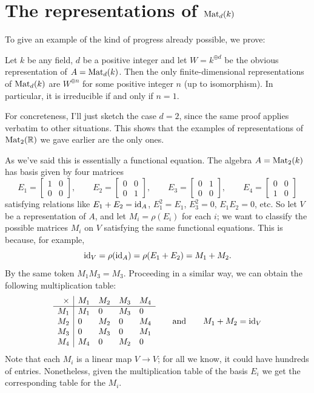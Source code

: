 \section{The representations of $\mathrm{Mat}_d(k)$}
To give an example of the kind of progress already possible, we prove:
\begin{theorem}
	\label{thm:rep_1mat}
	Let $k$ be any field, $d$ be a positive integer and
	let $W = k^{\oplus d}$ be the obvious representation of $A = \mathrm{Mat}_d(k)$.
	Then the only finite-dimensional representations
	of $\mathrm{Mat}_d(k)$ are $W^{\oplus n}$
	for some positive integer $n$ (up to isomorphism).
	In particular, it is irreducible if and only if $n=1$.
\end{theorem}
For concreteness, I'll just sketch the case $d=2$,
since the same proof applies verbatim to other situations.
This shows that the examples of representations of $\mathrm{Mat}_2(\mathbb R)$
we gave earlier are the only ones.

As we've said this is essentially a functional equation.
The algebra $A = \mathrm{Mat}_2(k)$ has basis given by four matrices
\[
	E_1 = \begin{bmatrix} 1 & 0 \\ 0 & 0 \end{bmatrix},
	\qquad
	E_2 = \begin{bmatrix} 0 & 0 \\ 0 & 1 \end{bmatrix},
	\qquad
	E_3 = \begin{bmatrix} 0 & 1 \\ 0 & 0 \end{bmatrix},
	\qquad
	E_4 = \begin{bmatrix} 0 & 0 \\ 1 & 0 \end{bmatrix}
\]
satisfying relations like $E_1 + E_2 = \mathrm{id}_A$, $E_1^2 = E_1$, $E_3^2 = 0$, $E_1E_2 = 0$, etc.
So let $V$ be a representation of $A$, and let $M_i = \rho(E_i)$ for each $i$;
we want to classify the possible matrices $M_i$ on $V$
satisfying the same functional equations.
This is because, for example,
\[ \mathrm{id}_V = \rho(\mathrm{id}_A) = \rho(E_1+E_2) = M_1 + M_2. \]
By the same token $M_1M_3 = M_3$.
Proceeding in a similar way, we can obtain the following multiplication table:
\[
	\begin{array}{r|llll}
		\times & M_1 & M_2 & M_3 & M_4 \\ \hline
		M_1 & M_1 & 0 & M_3 & 0 \\
		M_2 & 0 & M_2 & 0 & M_4 \\
		M_3 & 0 & M_3 & 0 & M_1 \\
		M_4 & M_4 & 0 & M_2 & 0
	\end{array}
	\qquad \text{and} \qquad
	M_1 + M_2 = \mathrm{id}_V
\]
Note that each $M_i$ is a linear map $V \to V$;
for all we know, it could have hundreds of entries.
Nonetheless, given the multiplication table of the basis $E_i$
we get the corresponding table for the $M_i$.

